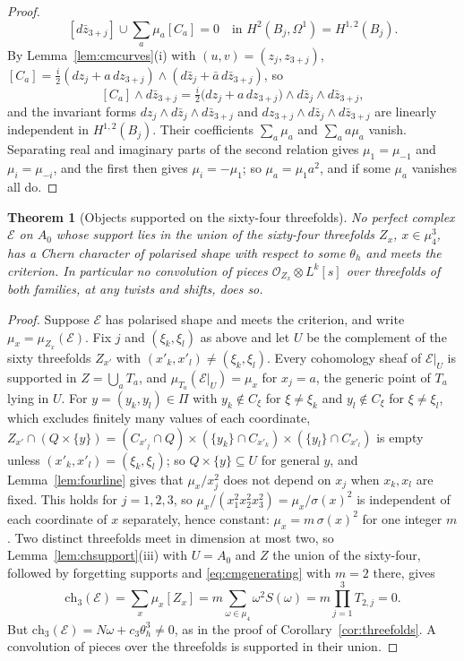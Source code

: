 \documentclass[11pt,reqno]{amsart}
\numberwithin{equation}{section}
\theoremstyle{plain}
\newtheorem{theorem}{Theorem}[section]
\theoremstyle{definition}
\newcommand{\ch}{\mathrm{ch}}
\begin{document}
\begin{proof}
\[
[d\bar z_{3+j}]\cup\sum_{a}\mu_{a}[C_{a}]=0\quad\text{in }H^{2}(B_{j},\Omega^{1})=H^{1,2}(B_{j}).
\]
By Lemma~\ref{lem:cmcurves}(i) with $(u,v)=(z_{j},z_{3+j})$, $[C_{a}]=\tfrac{i}{2}(dz_{j}+a\,dz_{3+j})\wedge(d\bar z_{j}+\bar a\,d\bar z_{3+j})$, so
\[
[C_{a}]\wedge d\bar z_{3+j}=\tfrac{i}{2}\bigl(dz_{j}+a\,dz_{3+j}\bigr)\wedge d\bar z_{j}\wedge d\bar z_{3+j},
\]
and the invariant forms $dz_{j}\wedge d\bar z_{j}\wedge d\bar z_{3+j}$ and $dz_{3+j}\wedge d\bar z_{j}\wedge d\bar z_{3+j}$ are linearly independent in $H^{1,2}(B_{j})$. Their coefficients $\sum_{a}\mu_{a}$ and $\sum_{a}a\mu_{a}$ vanish. Separating real and imaginary parts of the second relation gives $\mu_{1}=\mu_{-1}$ and $\mu_{i}=\mu_{-i}$, and the first then gives $\mu_{i}=-\mu_{1}$; so $\mu_{a}=\mu_{1}a^{2}$, and if some $\mu_{a}$ vanishes all do.
\end{proof}

\begin{theorem}[Objects supported on the sixty-four threefolds]\label{thm:sixtyfour}
No perfect complex $\mathcal{E}$ on $A_{0}$ whose support lies in the union of the sixty-four threefolds $Z_{x}$, $x\in\mu_{4}^{3}$, has a Chern character of polarised shape with respect to some $\theta_{h}$ and meets the criterion. In particular no convolution of pieces $\mathcal{O}_{Z_{x}}\otimes L^{k}[s]$ over threefolds of both families, at any twists and shifts, does so.
\end{theorem}

\begin{proof}
Suppose $\mathcal{E}$ has polarised shape and meets the criterion, and write $\mu_{x}=\mu_{Z_{x}}(\mathcal{E})$. Fix $j$ and $(\xi_{k},\xi_{l})$ as above and let $U$ be the complement of the sixty threefolds $Z_{x'}$ with $(x'_{k},x'_{l})\ne(\xi_{k},\xi_{l})$. Every cohomology sheaf of $\mathcal{E}|_{U}$ is supported in $Z=\bigcup_{a}T_{a}$, and $\mu_{T_{a}}(\mathcal{E}|_{U})=\mu_{x}$ for $x_{j}=a$, the generic point of $T_{a}$ lying in $U$. For $y=(y_{k},y_{l})\in\Pi$ with $y_{k}\notin C_{\xi}$ for $\xi\ne\xi_{k}$ and $y_{l}\notin C_{\xi}$ for $\xi\ne\xi_{l}$, which excludes finitely many values of each coordinate, $Z_{x'}\cap(Q\times\{y\})=(C_{x'_{j}}\cap Q)\times(\{y_{k}\}\cap C_{x'_{k}})\times(\{y_{l}\}\cap C_{x'_{l}})$ is empty unless $(x'_{k},x'_{l})=(\xi_{k},\xi_{l})$; so $Q\times\{y\}\subseteq U$ for general $y$, and Lemma~\ref{lem:fourline} gives that $\mu_{x}/x_{j}^{2}$ does not depend on $x_{j}$ when $x_{k},x_{l}$ are fixed. This holds for $j=1,2,3$, so $\mu_{x}/(x_{1}^{2}x_{2}^{2}x_{3}^{2})=\mu_{x}/\sigma(x)^{2}$ is independent of each coordinate of $x$ separately, hence constant: $\mu_{x}=m\,\sigma(x)^{2}$ for one integer $m$. Two distinct threefolds meet in dimension at most two, so Lemma~\ref{lem:chsupport}(iii) with $U=A_{0}$ and $Z$ the union of the sixty-four, followed by forgetting supports and \eqref{eq:cmgenerating} with $m=2$ there, gives
\[
\ch_{3}(\mathcal{E})=\sum_{x}\mu_{x}[Z_{x}]=m\sum_{\omega\in\mu_{4}}\omega^{2}S(\omega)=m\prod_{j=1}^{3}T_{2,j}=0 .
\]
But $\ch_{3}(\mathcal{E})=N\omega+c_{3}\theta_{h}^{3}\ne0$, as in the proof of Corollary~\ref{cor:threefolds}. A convolution of pieces over the threefolds is supported in their union.
\end{proof}
\end{document}

